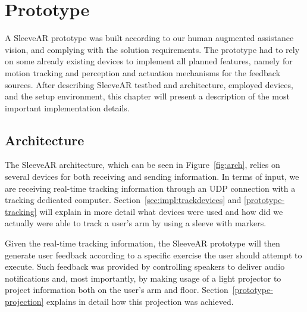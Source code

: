 \chapter{Prototype}
\label{sec:implementation}


A SleeveAR prototype was built according to our human augmented assistance vision, and complying with the solution requirements.
The prototype had to rely on some already existing devices to implement all planned features, namely for motion tracking and perception and actuation mechanisms for the feedback sources. After describing SleeveAR testbed and architecture, employed devices, and the setup environment, this chapter will present a description of the most important implementation details.

\section{Architecture}
\label{sec:impl:arch}

The SleeveAR architecture, which can be seen in Figure~\ref{fig:arch}, relies on several devices for both receiving and sending information.
In terms of input, we are receiving real-time tracking information through an UDP connection with a tracking dedicated computer. Section~\ref{sec:impl:trackdevices} and \ref{prototype-tracking} will explain in more detail what devices were used and how did we actually were able to track a user's arm by using a sleeve with markers.

Given the real-time tracking information, the SleeveAR prototype will then generate user feedback according to a specific exercise the user should attempt to execute. Such feedback was provided by controlling speakers to deliver audio notifications and, most importantly, by making usage of a light projector to project information both on the user's arm and floor. Section~\ref{prototype-projection} explains in detail how this projection was achieved.


